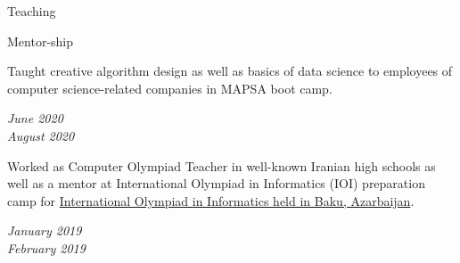 \documentclass{resume} %
\begin{document}
\begin{rSection}{Teaching}
\begin{rSubsection}{Mentor-ship}{}{}{}
\itemsep -1pt
\begin{small}
\item \parbox{15cm}{Taught creative algorithm design as well as basics of data science to employees of computer science-related companies in MAPSA boot camp.}
\end{small}
\hfill
\parbox{3cm}{\begin{flushright}
\begin{center}
\textcolor{Black!70}{\it June 2020 \\ August 2020}
\end{center}
\end{flushright}}
\begin{small}
\item \parbox{15cm}{Worked as Computer Olympiad Teacher in well-known Iranian high schools as well as a mentor at International Olympiad in Informatics (IOI) preparation camp for \href{https://ioi2019.az/}{International Olympiad in Informatics held in Baku, Azarbaijan}.}
\end{small}
\hfill 
\parbox{3cm}{\begin{flushright}
\begin{center}
\textcolor{Black!70}{\it January 2019 \\ February 2019}
\end{center}
\end{flushright}}
\end{rSubsection}
\end{rSection}
\end{document}
